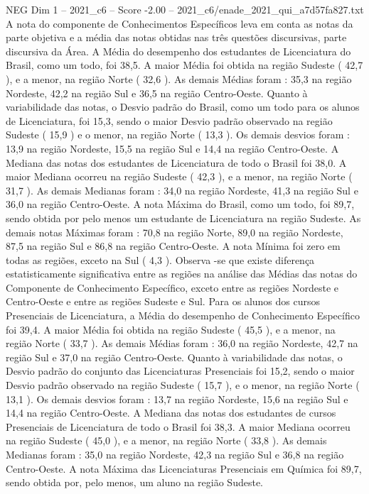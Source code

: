\begin{textsample}{NEG Dim 1 – 2021\_c6 – Score -2.00 – 2021\_c6/enade\_2021\_qui\_a7d57fa827.txt}
A nota do componente de Conhecimentos Específicos leva em conta as notas da parte objetiva e a média das notas obtidas nas três questões discursivas, parte discursiva da Área.
A Média do desempenho dos estudantes de Licenciatura do Brasil, como um todo, foi 38,5.
A maior Média foi obtida na região Sudeste ( 42,7 ), e a menor, na região Norte ( 32,6 ).
As demais Médias foram : 35,3 na região Nordeste, 42,2 na região Sul e 36,5 na região Centro-Oeste.
Quanto à variabilidade das notas, o Desvio padrão do Brasil, como um todo para os alunos de Licenciatura, foi 15,3, sendo o maior Desvio padrão observado na região Sudeste ( 15,9 ) e o menor, na região Norte ( 13,3 ).
Os demais desvios foram : 13,9 na região Nordeste, 15,5 na região Sul e 14,4 na região Centro-Oeste.
A Mediana das notas dos estudantes de Licenciatura de todo o Brasil foi 38,0.
A maior Mediana ocorreu na região Sudeste ( 42,3 ), e a menor, na região Norte ( 31,7 ).
As demais Medianas foram : 34,0 na região Nordeste, 41,3 na região Sul e 36,0 na região Centro-Oeste.
A nota Máxima do Brasil, como um todo, foi 89,7, sendo obtida por pelo menos um estudante de Licenciatura na região Sudeste.
As demais notas Máximas foram : 70,8 na região Norte, 89,0 na região Nordeste, 87,5 na região Sul e 86,8 na região Centro-Oeste.
A nota Mínima foi zero em todas as regiões, exceto na Sul ( 4,3 ).
Observa -se que existe diferença estatisticamente significativa entre as regiões na análise das Médias das notas do Componente de Conhecimento Específico, exceto entre as regiões Nordeste e Centro-Oeste e entre as regiões Sudeste e Sul.
Para os alunos dos cursos Presenciais de Licenciatura, a Média do desempenho de Conhecimento Específico foi 39,4.
A maior Média foi obtida na região Sudeste ( 45,5 ), e a menor, na região Norte ( 33,7 ).
As demais Médias foram : 36,0 na região Nordeste, 42,7 na região Sul e 37,0 na região Centro-Oeste.
Quanto à variabilidade das notas, o Desvio padrão do conjunto das Licenciaturas Presenciais foi 15,2, sendo o maior Desvio padrão observado na região Sudeste ( 15,7 ), e o menor, na região Norte ( 13,1 ).
Os demais desvios foram : 13,7 na região Nordeste, 15,6 na região Sul e 14,4 na região Centro-Oeste.
A Mediana das notas dos estudantes de cursos Presenciais de Licenciatura de todo o Brasil foi 38,3.
A maior Mediana ocorreu na região Sudeste ( 45,0 ), e a menor, na região Norte ( 33,8 ).
As demais Medianas foram : 35,0 na região Nordeste, 42,3 na região Sul e 36,8 na região Centro-Oeste.
A nota Máxima das Licenciaturas Presenciais em Química foi 89,7, sendo obtida por, pelo menos, um aluno na região Sudeste.

\end{textsample}
